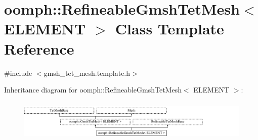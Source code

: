 \hypertarget{classoomph_1_1RefineableGmshTetMesh}{}\section{oomph\+:\+:Refineable\+Gmsh\+Tet\+Mesh$<$ E\+L\+E\+M\+E\+NT $>$ Class Template Reference}
\label{classoomph_1_1RefineableGmshTetMesh}


{\ttfamily \#include $<$gmsh\+\_\+tet\+\_\+mesh.\+template.\+h$>$}

Inheritance diagram for oomph\+:\+:Refineable\+Gmsh\+Tet\+Mesh$<$ E\+L\+E\+M\+E\+NT $>$\+:\begin{figure}[H]
\begin{center}
\leavevmode
\includegraphics[height=1.971831cm]{classoomph_1_1RefineableGmshTetMesh}
\end{center}
\end{figure}
